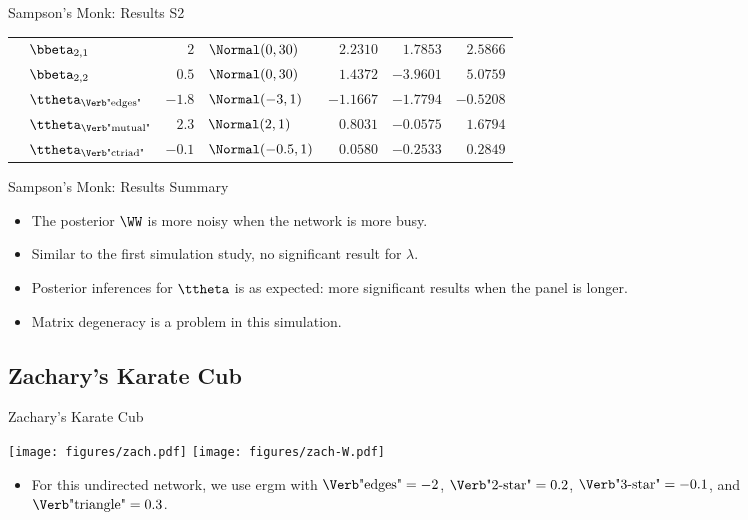 \documentclass{beamer}
\begin{document}
\begin{frame}{Sampson's Monk: Results S2}
\begin{center}
\begin{tabular}{cl|rlrrr}
			& $\bbeta_{2,1}$                   & $2$    & $\Normal(0,30)$      & $2.2310$  & $1.7853$  & $2.5866$  \\
			& $\bbeta_{2,2}$                   & $0.5$  & $\Normal(0,30)$      & $1.4372$  & $-3.9601$ & $5.0759$  \\
			& $\ttheta_{\text{\Verb"edges"}}$  & $-1.8$ & $\Normal(-3,1)$      & $-1.1667$ & $-1.7794$ & $-0.5208$ \\
			& $\ttheta_{\text{\Verb"mutual"}}$ & $2.3$  & $\Normal(2,1)$       & $0.8031$  & $-0.0575$ & $1.6794$  \\
			& $\ttheta_{\text{\Verb"ctriad"}}$ & $-0.1$ & $\Normal(-0.5,1)$    & $0.0580$  & $-0.2533$ & $0.2849$  \\
			\bottomrule
		\end{tabular}
	\end{center}
\end{frame}

\begin{frame}{Sampson's Monk: Results Summary}
	\begin{itemize}
		\item
			The posterior $\WW$ is more noisy when the network is more busy.
		\item
			Similar to the first simulation study, no significant result for $\lambda$.
		\item
			Posterior inferences for $\ttheta$ is as expected:
			more significant results when the panel is longer.
		\item
			Matrix degeneracy is a problem in this simulation.
	\end{itemize}
\end{frame}

\subsection{Zachary's Karate Cub}

\begin{frame}{Zachary's Karate Cub}
	\begin{center}
		\texttt{[image: figures/zach.pdf]}
		\texttt{[image: figures/zach-W.pdf]}
	\end{center}
	\begin{itemize}
		\item
			For this undirected network,
			we use \acrshort{ergm} with
			$\text{\Verb"edges"}=-2$,
			$\text{\Verb"2-star"}=0.2$,
			$\text{\Verb"3-star"}=-0.1$, and
			$\text{\Verb"triangle"}=0.3$.
	\end{itemize}
\end{frame}
\end{document}
